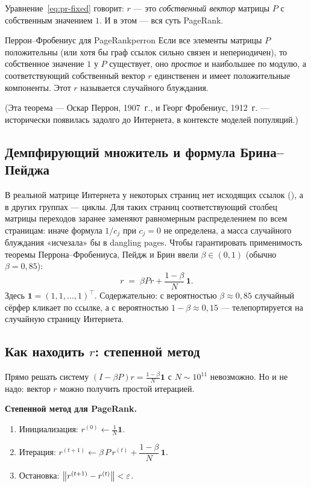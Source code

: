 Уравнение~\eqref{eq:pr-fixed} говорит: $r$ — это \emph{собственный
вектор} матрицы $P$ с собственным значением $1$. И в этом — вся суть
PageRank.

\begin{theorem}{Перрон--Фробениус для PageRank}{perron}
Если все элементы матрицы $P$ положительны (или хотя бы граф ссылок
сильно связен и непериодичен), то собственное значение $1$ у $P$
существует, оно \emph{простое} и наибольшее по модулю, а
соответствующий собственный вектор $r$ единственен и имеет
положительные компоненты. Этот $r$ называется  случайного блуждания.
\end{theorem}

(Эта теорема — Оскар Перрон, 1907~г., и Георг Фробениус, 1912~г. —
исторически появилась задолго до Интернета, в контексте моделей
популяций.)

\subsection{Демпфирующий множитель и формула Брина--Пейджа}

В реальной матрице Интернета у некоторых страниц нет исходящих ссылок
(), а в других группах — циклы. Для таких
страниц соответствующий столбец матрицы переходов заранее заменяют
равномерным распределением по всем страницам: иначе формула $1/c_j$
при $c_j=0$ не определена, а масса случайного блуждания «исчезала» бы
в dangling pages. Чтобы
гарантировать применимость теоремы Перрона--Фробениуса, Пейдж и Брин
ввели  $\beta\in(0,1)$ (обычно
$\beta=0{,}85$):
\begin{equation}\label{eq:pagerank}
\boxed{\;r\;=\;\beta P r + \dfrac{1-\beta}{N}\,\mathbf{1}.\;}
\end{equation}
Здесь $\mathbf{1}=(1,1,\ldots,1)^{\!\top}$. Содержательно:
с вероятностью $\beta\approx 0{,}85$ случайный сёрфер кликает по
ссылке, а с вероятностью $1-\beta\approx 0{,}15$ — телепортируется
на случайную страницу Интернета.

\subsection{Как находить $r$: степенной метод}

Прямо решать систему $(I-\beta P)r=\frac{1-\beta}{N}\mathbf{1}$
с $N\sim 10^{11}$ невозможно. Но и не надо: вектор $r$ можно
получить простой итерацией.

\begin{algorithmbox}
\textbf{Степенной метод для PageRank.}
\begin{enumerate}\itemsep1pt
  \item Инициализация: $r^{(0)} \leftarrow \tfrac{1}{N}\mathbf{1}$.
  \item Итерация: $r^{(t+1)} \leftarrow \beta\,P\,r^{(t)} +
        \dfrac{1-\beta}{N}\,\mathbf{1}$.
  \item Остановка: $\left\|r^{(t+1)}-r^{(t)}\right\| < \varepsilon$.
\end{enumerate}
\end{algorithmbox}

